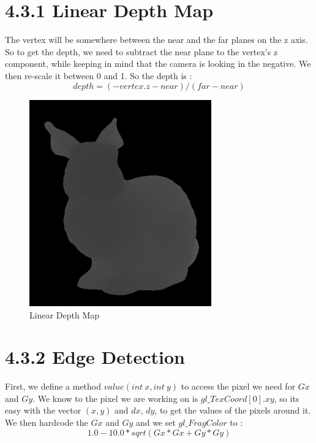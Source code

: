 \documentclass[10pt,a4paper]{report}
\begin{document}
\section*{4.3.1   Linear Depth Map }
The vertex will be somewhere between the near and the far planes on the z axis. So to get the depth, we need to subtract the near plane to the vertex's z component, while keeping in mind that the camera is looking in the negative. We then re-scale it between 0 and 1. So the depth is : $$depth = (-vertex.z - near)/(far - near)$$
\begin{figure}[h!]
\caption{Linear Depth Map}
  \centering
    \includegraphics[width=0.7\textwidth]{linearDepthMap.png}
\end{figure}
\newpage

\section*{4.3.2   Edge Detection }
First, we define a method $value(int\ x, int\ y)$ to access the pixel we need for $Gx$ and $Gy$. We know to the pixel we are working on is $gl\_TexCoord[0].xy$, so its easy with the vector $(x,y)$ and $dx$, $dy$, to get the values of the pixels around it. We then hardcode the $Gx$ and $Gy$ and we set $gl\_FragColor$ to : $$1.0 - 10.0*sqrt(Gx*Gx + Gy*Gy)$$
\end{document}
